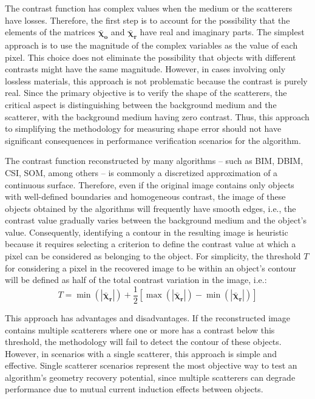 \documentclass{ieeeaccess}
\newcommand{\Xo}{\boldsymbol{\bar{\chi}_o}}
\newcommand{\Xr}{\boldsymbol{\bar{\chi}_r}}
\begin{document}
        The contrast function has complex values when the medium or the scatterers have losses. Therefore, the first step is to account for the possibility that the elements of the matrices $\Xo$ and $\Xr$ have real and imaginary parts. The simplest approach is to use the magnitude of the complex variables as the value of each pixel. This choice does not eliminate the possibility that objects with different contrasts might have the same magnitude. However, in cases involving only lossless materials, this approach is not problematic because the contrast is purely real. Since the primary objective is to verify the shape of the scatterers, the critical aspect is distinguishing between the background medium and the scatterer, with the background medium having zero contrast. Thus, this approach to simplifying the methodology for measuring shape error should not have significant consequences in performance verification scenarios for the algorithm.

        The contrast function reconstructed by many algorithms -- such as BIM, DBIM, CSI, SOM, among others -- is commonly a discretized approximation of a continuous surface. Therefore, even if the original image contains only objects with well-defined boundaries and homogeneous contrast, the image of these objects obtained by the algorithms will frequently have smooth edges, i.e., the contrast value gradually varies between the background medium and the object's value. Consequently, identifying a contour in the resulting image is heuristic because it requires selecting a criterion to define the contrast value at which a pixel can be considered as belonging to the object. For simplicity, the threshold $T$ for considering a pixel in the recovered image to be within an object's contour will be defined as half of the total contrast variation in the image, i.e.:
        \begin{equation}
            T = \min(|\Xr|) + \frac{1}{2} \left[\max(|\Xr|)-\min(|\Xr|)\right]
        \end{equation}

        This approach has advantages and disadvantages. If the reconstructed image contains multiple scatterers where one or more has a contrast below this threshold, the methodology will fail to detect the contour of these objects. However, in scenarios with a single scatterer, this approach is simple and effective. Single scatterer scenarios represent the most objective way to test an algorithm's geometry recovery potential, since multiple scatterers can degrade performance due to mutual current induction effects between objects.
\end{document}
